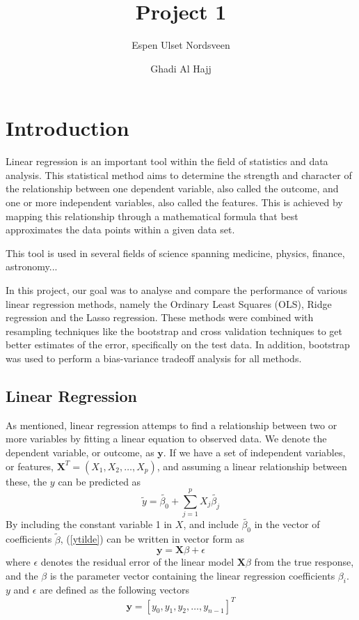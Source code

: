 \documentclass{article}
\title{Project 1}
\author{Espen Ulset Nordsveen
\and Ghadi Al Hajj}
\begin{document}
\maketitle
\section{Introduction}
Linear regression is an important tool within the field of statistics and data analysis. This statistical method aims to determine the strength and character of the relationship between one dependent variable, also called the outcome, and one or more independent variables, also called the features. This is achieved by mapping this relationship through a mathematical formula that best approximates the data points within a given data set.

This tool is used in several fields of science spanning medicine, physics, finance, astronomy...

In this project, our goal was to analyse and compare the performance of various linear regression methods, namely the Ordinary Least Squares (OLS), Ridge regression and the Lasso regression. These methods were combined with resampling techniques like the bootstrap and cross validation techniques to get better estimates of the error, specifically on the test data. In addition, bootstrap was used to perform a bias-variance tradeoff analysis for all methods.

\subsection{Linear Regression}
As mentioned, linear regression attemps to find a relationship between two or more variables by fitting a linear equation to observed data. We denote the dependent variable, or outcome, as $\textbf{y}$. If we have a set of independent variables, or features, $\textbf{X}^{T} = (X_{1}, X_{2}, \dots, X_{p})$, and assuming a linear relationship between these, the $y$ can be predicted as
\begin{equation} \label{ytilde}
\tilde{y} = \tilde{\beta_{0}} + \sum_{j=1}^{p} X_{j} \tilde{\beta_{j}}
\end{equation}
By including the constant variable 1 in $X$, and include $\tilde{\beta_{0}}$ in the vector of coefficients $\tilde{\beta}$,  (\ref{ytilde}) can be written in vector form as
\begin{equation}\label{matrixform}
\textbf{y} = \textbf{X} \beta + \epsilon
\end{equation}
where $\epsilon$ denotes the residual error of the linear model $\textbf{X}\beta$ from the true response, and the $\beta$ is the parameter vector containing the linear regression coefficients $\beta_{i}$. $y$ and $\epsilon$ are defined as the following vectors
\begin{equation}
\textbf{y} = [y_{0}, y_{1}, y_{2}, \dots, y_{n-1}]^{T}
\end{equation}
\end{document}
